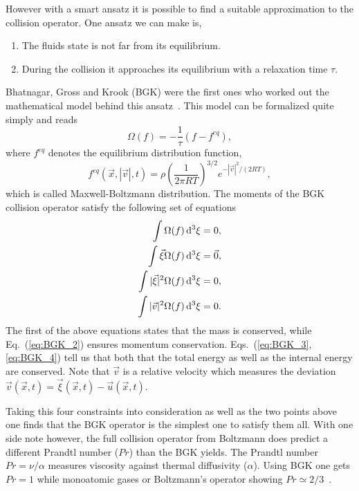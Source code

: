 However with a smart ansatz it is possible to find a suitable approximation to the collision operator.
One ansatz we can make is,
\begin{enumerate}
    \item The fluids state is not far from its equilibrium.
    \item During the collision it approaches its equilibrium with a relaxation time $\tau$.
\end{enumerate}
Bhatnagar, Gross and Krook (BGK) were the first ones who worked out the mathematical model behind this ansatz~\cite{bhatnagarModelCollisionProcesses1954}.
This model can be formalized quite simply and reads
\begin{equation}\label{eq:operator_bgk}
    \Omega(f) = -\frac{1}{\tau}(f - f^{eq}),
\end{equation}
where $f^{eq}$ denotes the equilibrium distribution function,
\begin{equation}\label{eq:boltzmann_eq_dist}
    f^{eq}(\vec{x}, |\vec{v}|, t) = \rho\left(\frac{1}{2\pi R T}\right)^{3/2} e^{-|\vec{v}|^2/(2RT)},
\end{equation}
which is called Maxwell-Boltzmann distribution.
The moments of the BGK collision operator satisfy the following set of equations
\begin{align}
    \int \Omega(f) \mathop{}\!\mathrm{d}^3\xi = 0, \label{eq:BGK_1}\\
    \int \vec{\xi}\Omega(f) \mathop{}\!\mathrm{d}^3\xi = \vec{0}, \label{eq:BGK_2}\\
    \int |\vec{\xi}|^2\Omega(f) \mathop{}\!\mathrm{d}^3\xi = 0, \label{eq:BGK_3}\\
    \int |\vec{v}|^2\Omega(f) \mathop{}\!\mathrm{d}^3\xi = 0. \label{eq:BGK_4}
\end{align}
The first of the above equations states that the mass is conserved, while Eq.~(\ref{eq:BGK_2}) ensures momentum conservation.
Eqs.~(\ref{eq:BGK_3}, \ref{eq:BGK_4}) tell us that both that the total energy as well as the internal energy are conserved.
Note that $\vec{v}$ is a relative velocity which measures the deviation $\vec{v}(\vec{x}, t) = \vec{\xi}(\vec{x}, t) - \vec{u}(\vec{x}, t)$.

Taking this four constraints into consideration as well as the two points above one finds that the BGK operator is the simplest one to satisfy them all.
With one side note however, the full collision operator from Boltzmann does predict a different Prandtl number ($Pr$) than the BGK yields.
The Prandtl number $Pr = \nu/\alpha$ measures viscosity against thermal diffusivity ($\alpha$). 
Using BGK one gets $Pr=1$ while monoatomic gases or Boltzmann's operator showing $Pr\simeq 2/3$~\cite{cercignaniBoltzmannEquation1988, krugerLatticeBoltzmannMethod2017}.

